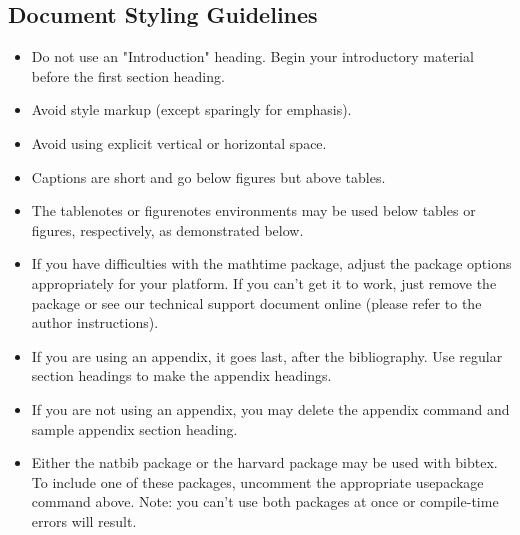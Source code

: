 \documentclass[AER]{AEA}
\begin{document}
\hypertarget{document-styling-guidelines}{%
\subsection{Document Styling
Guidelines}\label{document-styling-guidelines}}

\begin{itemize}
\item Do not use an "Introduction" heading. Begin your introductory material
before the first section heading.

\item Avoid style markup (except sparingly for emphasis).

\item Avoid using explicit vertical or horizontal space.

\item Captions are short and go below figures but above tables.

\item The tablenotes or figurenotes environments may be used below tables
or figures, respectively, as demonstrated below.

\item If you have difficulties with the mathtime package, adjust the package
options appropriately for your platform. If you can't get it to work, just
remove the package or see our technical support document online (please
refer to the author instructions).

\item If you are using an appendix, it goes last, after the bibliography.
Use regular section headings to make the appendix headings.

\item If you are not using an appendix, you may delete the appendix command
and sample appendix section heading.

\item Either the natbib package or the harvard package may be used with bibtex.
To include one of these packages, uncomment the appropriate usepackage command
above. Note: you can't use both packages at once or compile-time errors will result.

\end{itemize}

\hypertarget{section}{%
\subsection{}\label{section}}
\end{document}
